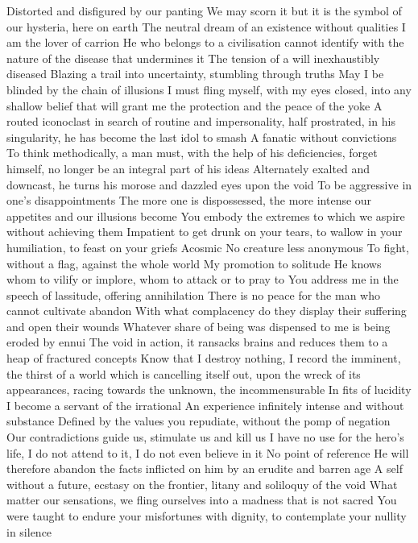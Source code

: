 \documentclass{article}
\begin{document}
Distorted and disfigured by our panting
We may scorn it but it is the symbol of our hysteria, here on earth
The neutral dream of an existence without qualities
I am the lover of carrion
He who belongs to a civilisation cannot identify with the nature of the disease that undermines it
The tension of a will inexhaustibly diseased
Blazing a trail into uncertainty, stumbling through truths
May I be blinded by the chain of illusions
I must fling myself, with my eyes closed, into any shallow belief that will grant me the protection and the peace of the yoke
A routed iconoclast in search of routine and impersonality, half prostrated, in his singularity, he has become the last idol to smash
A fanatic without convictions
To think methodically, a man must, with the help of his deficiencies, forget himself, no longer be an integral part of his ideas
Alternately exalted and downcast, he turns his morose and dazzled eyes upon the void
To be aggressive in one's disappointments
The more one is dispossessed, the more intense our appetites and our illusions become
You embody the extremes to which we aspire without achieving them
Impatient to get drunk on your tears, to wallow in your humiliation, to feast on your griefs
Acosmic
No creature less anonymous
To fight, without a flag, against the whole world
My promotion to solitude
He knows whom to vilify or implore, whom to attack or to pray to
You address me in the speech of lassitude, offering annihilation
There is no peace for the man who cannot cultivate abandon
With what complacency do they display their suffering and open their wounds
Whatever share of being was dispensed to me is being eroded by ennui
The void in action, it ransacks brains and reduces them to a heap of fractured concepts
Know that I destroy nothing, I record the imminent, the thirst of a world which is cancelling itself out, upon the wreck of its appearances, racing towards the unknown, the incommensurable
In fits of lucidity I become a servant of the irrational
An experience infinitely intense and without substance
Defined by the values you repudiate, without the pomp of negation
Our contradictions guide us, stimulate us and kill us
I have no use for the hero's life, I do not attend to it, I do not even believe in it
No point of reference
He will therefore abandon the facts inflicted on him by an erudite and barren age
A self without a future, ecstasy on the frontier, litany and soliloquy of the void
What matter our sensations, we fling ourselves into a madness that is not sacred
You were taught to endure your misfortunes with dignity, to contemplate your nullity in silence
\end{document}
